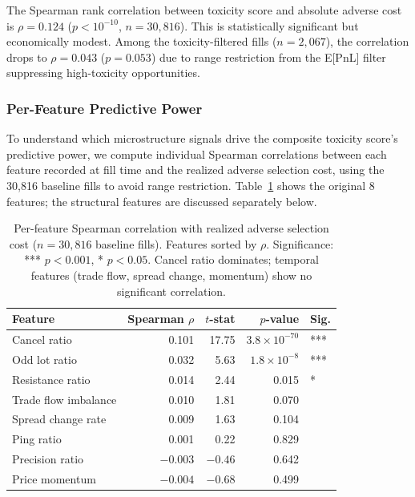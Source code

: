 \documentclass[11pt]{article}
\theoremstyle{definition}
\begin{document}
The Spearman rank correlation between toxicity score and absolute adverse cost is $\rho = 0.124$ ($p < 10^{-10}$, $n = 30{,}816$). This is statistically significant but economically modest. Among the toxicity-filtered fills ($n = 2{,}067$), the correlation drops to $\rho = 0.043$ ($p = 0.053$) due to range restriction from the E[PnL] filter suppressing high-toxicity opportunities.

\subsubsection{Per-Feature Predictive Power}
\label{sec:perfeature}

To understand which microstructure signals drive the composite toxicity score's predictive power, we compute individual Spearman correlations between each feature recorded at fill time and the realized adverse selection cost, using the 30,816 baseline fills to avoid range restriction. Table~\ref{tab:perfeature} shows the original 8 features; the structural features are discussed separately below.

\begin{table}[H]
\centering
\begin{tabular}{lrrrl}
\toprule
\textbf{Feature} & \textbf{Spearman $\rho$} & \textbf{$t$-stat} & \textbf{$p$-value} & \textbf{Sig.} \\
\midrule
Cancel ratio & 0.101 & 17.75 & $3.8 \times 10^{-70}$ & *** \\
Odd lot ratio & 0.032 & 5.63 & $1.8 \times 10^{-8}$ & *** \\
Resistance ratio & 0.014 & 2.44 & 0.015 & * \\
Trade flow imbalance & 0.010 & 1.81 & 0.070 & \\
Spread change rate & 0.009 & 1.63 & 0.104 & \\
Ping ratio & 0.001 & 0.22 & 0.829 & \\
Precision ratio & $-0.003$ & $-0.46$ & 0.642 & \\
Price momentum & $-0.004$ & $-0.68$ & 0.499 & \\
\bottomrule
\end{tabular}
\caption{Per-feature Spearman correlation with realized adverse selection cost ($n = 30{,}816$ baseline fills). Features sorted by $\rho$. Significance: *** $p < 0.001$, * $p < 0.05$. Cancel ratio dominates; temporal features (trade flow, spread change, momentum) show no significant correlation.}
\label{tab:perfeature}
\end{table}
\end{document}
